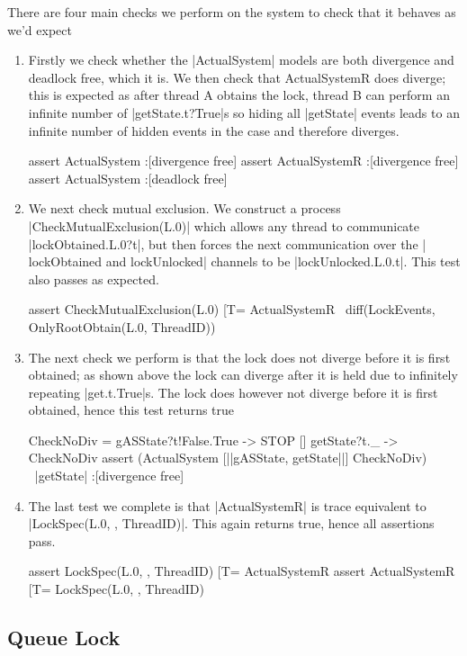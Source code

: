There are four main checks we perform on the system to check that it behaves as we'd expect
\begin{enumerate}
  \item Firstly we check whether the |ActualSystem| models are both divergence and deadlock free, which it is. We then check that ActualSystemR does diverge; this is expected as after thread A obtains the lock, thread B can perform an infinite number of |getState.t?True|s so hiding all |getState| events leads to an infinite number of hidden events in the case and therefore diverges.
\begin{cspm}
  assert ActualSystem :[divergence free]
  assert ActualSystemR :[divergence free]
  assert ActualSystem :[deadlock free]
\end{cspm}
\item We next check mutual exclusion. We construct a process |CheckMutualExclusion(L.0)| which allows any thread to communicate |lockObtained.L.0?t|, but then forces the next communication over the | lockObtained and lockUnlocked| channels to be |lockUnlocked.L.0.t|. This test also passes as expected.
\begin{cspm}
  assert CheckMutualExclusion(L.0) [T= ActualSystemR \ diff(LockEvents, OnlyRootObtain(L.0, ThreadID))
\end{cspm}
\item The next check we perform is that the lock does not diverge before it is first obtained; as shown above the lock can diverge after it is held due to infinitely repeating |get.t.True|s. The lock does however not diverge before it is first obtained, hence this test returns true
\begin{cspm}
  CheckNoDiv = gASState?t!False.True -> STOP
             [] getState?t._ -> CheckNoDiv
assert (ActualSystem [|{|gASState, getState|}|] CheckNoDiv) \ {|getState|} :[divergence free]
\end{cspm}
\item The last test we complete is that |ActualSystemR| is trace equivalent to |LockSpec(L.0, {}, ThreadID)|. This again returns true, hence all assertions pass.
\begin{cspm}
  assert LockSpec(L.0, {}, ThreadID) [T= ActualSystemR
  assert ActualSystemR [T= LockSpec(L.0, {}, ThreadID)
\end{cspm}
\end{enumerate}
\subsection{Queue Lock}

